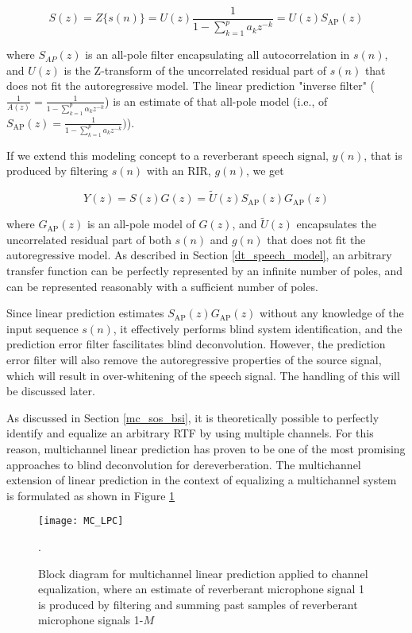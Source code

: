 \begin{equation}
	S(z)=Z\{s(n)\}=U(z) \frac{1}{1 - \sum_{k=1}^{p}a_k z^{-k}}  = U(z) S_{\mathrm{AP}}(z)
\end{equation}

\noindent
where $S_{AP}(z)$ is an all-pole filter encapsulating all autocorrelation in $s(n)$, and $U(z)$ is the Z-transform of the uncorrelated residual part of $s(n)$  that does not fit the autoregressive model. The linear prediction "inverse filter" ($\frac{1}{A(z)} =\frac{1}{1 - \sum_{k=1}^{p}\alpha_k z^{-k}}$)  is an estimate of that all-pole model (i.e., of $S_{\mathrm{AP}}(z) = \frac{1}{1 - \sum_{k=1}^{p}a_k z^{-k}})$). 

If we extend this modeling concept to a reverberant speech signal, $y(n)$, that is produced by filtering $s(n)$ with an RIR, $g(n)$, we get

\begin{equation}
	Y(z) = S(z) G(z) = \tilde{U}(z) S_{\mathrm{AP}}(z) G_{\mathrm{AP}}(z)
\end{equation}


\noindent
where $G_{\mathrm{AP}}(z)$ is an all-pole model of $G(z)$, and $\tilde{U}(z)$ encapsulates the uncorrelated residual part of both $s(n)$  and $g(n)$ that does not fit the autoregressive model. As described in Section \ref{dt_speech_model}, an arbitrary transfer function can be perfectly represented by an infinite number of poles, and can be represented reasonably with a sufficient number of poles.

Since linear prediction estimates $S_{\mathrm{AP}}(z)G_{\mathrm{AP}}(z)$ without any knowledge of the input sequence $s(n)$, it effectively performs blind system identification, and the prediction error filter fascilitates blind deconvolution. However, the prediction error filter will also remove the autoregressive properties of the source signal, which will result in over-whitening of the speech signal. The handling of this will be discussed later.

As discussed in Section \ref{mc_sos_bsi}, it is theoretically possible to perfectly identify and equalize an arbitrary RTF by using multiple channels. For this reason, multichannel linear prediction has proven to be one of the most promising approaches to blind deconvolution for dereverberation. The multichannel extension of linear prediction in the context of equalizing a multichannel system is formulated as shown in Figure \ref{fig:MC_LPC}

\begin{figure}[H]
	\texttt{[image: MC\_LPC]}
	\centering
	\caption{Block diagram for multichannel linear prediction applied to channel equalization, where an estimate of reverberant microphone signal 1 is produced by filtering and summing past samples of reverberant microphone signals 1-$M$}.
	\label{fig:MC_LPC}
\end{figure}

